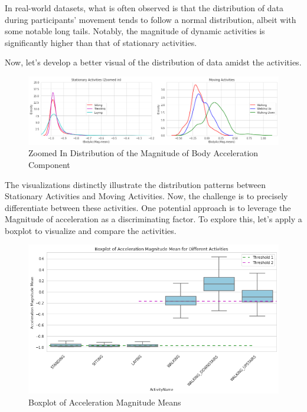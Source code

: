 \documentclass[conference]{IEEEtran}
\begin{document}
In real-world datasets, what is often observed is that the distribution of data during participants' movement tends to follow a normal distribution, albeit with some notable long tails. Notably, the magnitude of dynamic activities is significantly higher than that of stationary activities.  \newline 

Now, let's develop a better visual of the distribution of data amidst the activities. \newline 

\begin{figure}[h!]
	\includegraphics[width= 1.0 \linewidth]{zoomed_distribution_acc_activity.png}
	\centering
	\caption{Zoomed In Distribution of the Magnitude of Body Acceleration Component}
	\label{zoomed_distribution_acc_activity.png}
\end{figure}

The visualizations distinctly illustrate the distribution patterns between Stationary Activities and Moving Activities. Now, the challenge is to precisely differentiate between these activities. One potential approach is to leverage the Magnitude of acceleration as a discriminating factor. To explore this, let's apply a boxplot to visualize and compare the activities.

\begin{figure}[h!]
	\includegraphics[width= 1.0 \linewidth]{boxplot_acc_magnitude_mean.png}
	\centering
	\caption{Boxplot of Acceleration Magnitude Means}
	\label{boxplot_acc_magnitude_mean.png}
\end{figure}
\end{document}
